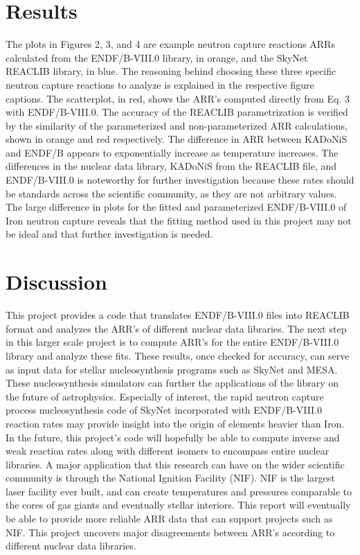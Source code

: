 \documentclass{article}
\begin{document}
\section{Results}
The plots in Figures 2, 3, and 4 are example neutron capture reactions ARRs calculated from the ENDF/B-VIII.0 library, in orange, and the SkyNet REACLIB library, in blue.\cite{ENDF, SkyNet} The reasoning behind choosing these three specific neutron capture reactions to analyze is explained in the respective figure captions. The scatterplot, in red, shows the ARR's computed directly from Eq. 3 with ENDF/B-VIII.0.  The accuracy of the REACLIB parametrization is verified by the similarity of the parameterized and non-parameterized ARR calculations, shown in orange and red respectively. The difference in ARR between KADoNiS and ENDF/B appears to exponentially increase as temperature increases. The differences in the nuclear data library, KADoNiS from the REACLIB file, and ENDF/B-VIII.0 is noteworthy for further investigation because these rates should be standards across the scientific community, as they are not arbitrary values. \cite{kadonis}The large difference in plots for the fitted and parameterized ENDF/B-VIII.0 of Iron neutron capture reveals that the fitting method used in this project may not be ideal and that further investigation is needed.
\section{Discussion}
This project provides a code that translates ENDF/B-VIII.0 files into REACLIB format and analyzes the ARR's of different nuclear data libraries. The next step in this larger scale project is to compute ARR's for the entire ENDF/B-VIII.0 library and analyze these fits. These results, once checked for accuracy, can serve as input data for stellar nucleosynthesis programs such as SkyNet\cite{SkyNet} and MESA.\cite{mesa} These nucleosynthesis simulators can further the applications of the library on the future of astrophysics. Especially of interest, the rapid neutron capture process nucleosynthesis code of SkyNet incorporated with ENDF/B-VIII.0 reaction rates may provide insight into the origin of elements heavier than Iron.  In the future, this project's code will hopefully be able to compute inverse and weak reaction rates along with different isomers to encompass entire nuclear libraries. A major application that this research can have on the wider scientific community is through the National Ignition Facility (NIF). NIF is the largest laser facility ever built, and can create temperatures and pressures comparable to the cores of gas giants and eventually stellar interiors. This report will eventually be able to provide more reliable ARR data that can support projects such as NIF.\cite{nif} This project uncovers major disagreements between ARR's according to different nuclear data libraries.
\end{document}
